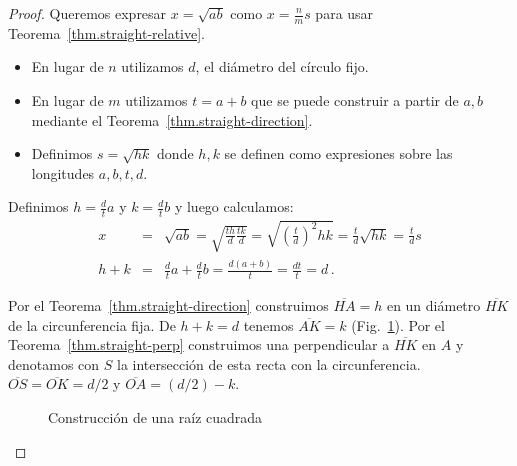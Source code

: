 \begin{proof}
Queremos expresar $x=\sqrt{ab}$ como $x=\displaystyle\frac{n}{m}s$ para usar Teorema~\ref{thm.straight-relative}.
\begin{itemize}
\setlength{\itemsep}{0pt}
\item En lugar de $n$ utilizamos $d$, el diámetro del círculo fijo.
\item En lugar de $m$ utilizamos $t=a+b$ que se puede construir a partir de $a,b$ mediante el Teorema~\ref{thm.straight-direction}.
\item Definimos $s=\sqrt{hk}$ donde $h,k$ se definen como expresiones sobre las longitudes $a,b,t,d$.
\end{itemize}
Definimos $h=\displaystyle\frac{d}{t}a$ y $k=\displaystyle\frac{d}{t}b$ y luego calculamos:
\begin{eqnarray*}
x&=&\sqrt{ab}=\sqrt{\frac{th}{d}\frac{tk}{d}}=\sqrt{\left(\frac{t}{d}\right)^2hk}=\frac{t}{d}\sqrt{hk}=\frac{t}{d}s\\
h+k &=& \frac{d}{t}a + \frac{d}{t}b = \frac{d(a+b)}{t} = \frac{dt}{t} = d\,.
\end{eqnarray*}

Por el Teorema~\ref{thm.straight-direction} construimos $\overline{HA}= h$ en un diámetro $\overline{HK}$ de la circunferencia fija. De $h+k=d$ tenemos $\overline{AK}=k$ (Fig.~\ref{f.se-sqrt}). Por el Teorema~\ref{thm.straight-perp} construimos una perpendicular a $\overline{HK}$ en $A$ y denotamos con $S$ la intersección de esta recta con la circunferencia. $\overline{OS}=\overline{OK}=d/2$ y $\overline{OA}=(d/2)-k$. 
\begin{figure}[t]
\begin{center}
\end{center}
\caption{Construcción de una raíz cuadrada}\label{f.se-sqrt}
\end{figure}


\end{proof}
